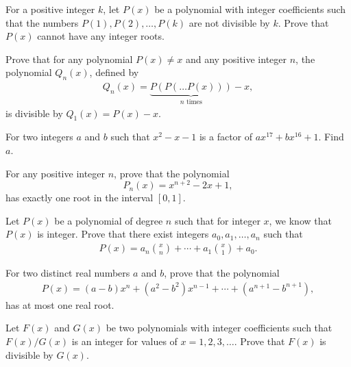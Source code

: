 \documentclass[12pt,a4paper]{memoir}
\theoremstyle{definition}
\begin{document}
\begin{question}
	For a positive integer $k$, let $P(x)$ be a polynomial with integer coefficients such that the numbers $P(1),P(2),\dots,P(k)$ are not divisible by $k$. Prove that $P(x)$ cannot have any integer roots.
\end{question}



\begin{question}[name={1978 Romania}]
	Prove that for any polynomial $P(x)\neq x$ and any positive integer $n$, the polynomial $Q_n(x)$, defined by
	\begin{align*}
		Q_n(x)=\underbrace{P(P(\dots P(x)))}_{n \text{ times}} - x,
	\end{align*}
	is divisible by $Q_1(x)=P(x)-x$.
\end{question}


\begin{question}
	For two integers $a$ and $b$ such that $x^2-x-1$ is a factor of $ax^{17}+bx^{16}+1$. Find $a$.
\end{question}




\begin{question}
	For any positive integer $n$, prove that the polynomial \[P_n(x)=x^{n+2}-2x+1,\] has exactly one root in the interval $[0,1]$.
\end{question}


\begin{question}[name={1999 Iran}]
	Let $P(x)$ be a polynomial of degree $n$ such that for integer $x$, we know that $P(x)$ is integer. Prove that there exist integers $a_0,a_1,\dots,a_n$ such that
	\begin{align*}
		P(x)=a_n\binom{x}{n}+\cdots+a_1\binom{x}{1} + a_0.
	\end{align*}
\end{question}


\begin{question}
	For two distinct real numbers $a$ and $b$, prove that the polynomial
	\begin{align*}
		P(x)=(a-b)x^n + (a^2-b^2)x^{n-1} + \cdots + (a^{n+1} - b^{n+1}),
	\end{align*}
	has at most one real root.
\end{question}


\begin{question}[name={1995 Iran First Round}]
	Let $F(x)$ and $G(x)$ be two polynomials with integer coefficients such that $F(x)/G(x)$ is an integer for values of $x=1,2,3,\dots$. Prove that $F(x)$ is divisible by $G(x)$.
\end{question}
\end{document}
